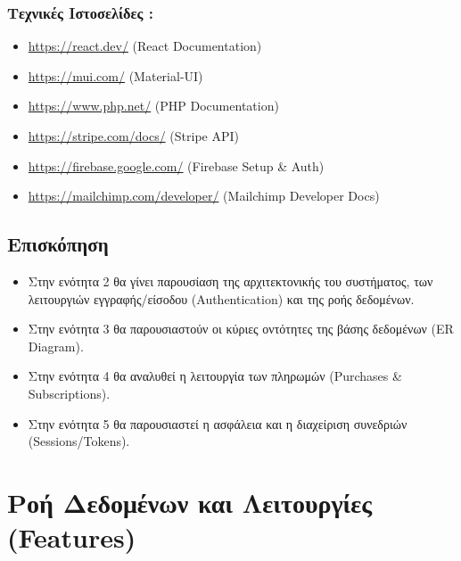 \documentclass[12pt,a4paper]{report}
\begin{document}
\subsubsection{Τεχνικές Ιστοσελίδες :}
\begin{itemize}[label=•]
    \item \url{https://react.dev/} (React Documentation)
    \item \url{https://mui.com/} (Material-UI)
    \item \url{https://www.php.net/} (PHP Documentation)
    \item \url{https://stripe.com/docs/} (Stripe API)
    \item \url{https://firebase.google.com/} (Firebase Setup \& Auth)
    \item \url{https://mailchimp.com/developer/} (Mailchimp Developer Docs)
\end{itemize}

\subsection{Επισκόπηση}
\begin{itemize}
    \item Στην ενότητα 2 θα γίνει παρουσίαση της αρχιτεκτονικής του συστήματος, των λειτουργιών εγγραφής/είσοδου (Authentication) και της ροής δεδομένων.
    \item Στην ενότητα 3 θα παρουσιαστούν οι κύριες οντότητες της βάσης δεδομένων (ER Diagram).
    \item Στην ενότητα 4 θα αναλυθεί η λειτουργία των πληρωμών (\textenglish{Purchases \& Subscriptions}).
    \item Στην ενότητα 5 θα παρουσιαστεί η ασφάλεια και η διαχείριση συνεδριών (Sessions/Tokens).
\end{itemize}

\newpage

\section{Ροή Δεδομένων και Λειτουργίες (Features)}
\end{document}
